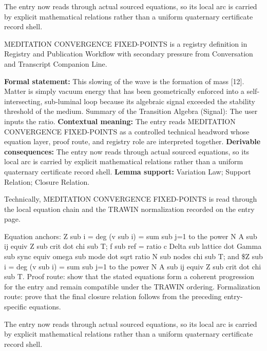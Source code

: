 The entry now reads through actual sourced equations, so its local arc is carried by explicit mathematical relations rather than a uniform quaternary certificate record shell.
\clearpage


\begingroup\small
{}
MEDITATION CONVERGENCE FIXED-POINTS is a registry definition in Registry and Publication Workflow with secondary pressure from Conversation and Transcript Companion Line.

\begingroup\footnotesize\setlength{\emergencystretch}{3em}\sloppy
\textbf{Formal statement:} This slowing of the wave is the formation of mass [12]. Matter is simply vacuum energy that has been geometrically enforced into a self-intersecting, sub-luminal loop because its algebraic signal exceeded the stability threshold of the medium. Summary of the Transition Algebra (Signal): The user inputs the ratio. \textbf{Contextual meaning:} The entry reads MEDITATION CONVERGENCE FIXED-POINTS as a controlled technical headword whose equation layer, proof route, and registry role are interpreted together. \textbf{Derivable consequences:} The entry now reads through actual sourced equations, so its local arc is carried by explicit mathematical relations rather than a uniform quaternary certificate record shell. \textbf{Lemma support:} Variation Law; Support Relation; Closure Relation.\par
\endgroup

Technically, MEDITATION CONVERGENCE FIXED-POINTS is read through the local equation chain and the TRAWIN normalization recorded on the entry page.

Equation anchors: Z sub i = deg (v sub i) = sum sub j=1 to the power N A sub ij equiv Z sub crit dot chi sub T; f sub ref = ratio c Delta sub lattice dot Gamma sub sync equiv omega sub mode dot sqrt ratio N sub nodes chi sub T; and \$Z sub i = deg (v sub i) = sum sub j=1 to the power N A sub ij equiv Z sub crit dot chi sub T. Proof route: show that the stated equations form a coherent progression for the entry and remain compatible under the TRAWIN ordering. Formalization route: prove that the final closure relation follows from the preceding entry-specific equations.

The entry now reads through actual sourced equations, so its local arc is carried by explicit mathematical relations rather than a uniform quaternary certificate record shell.
\endgroup

